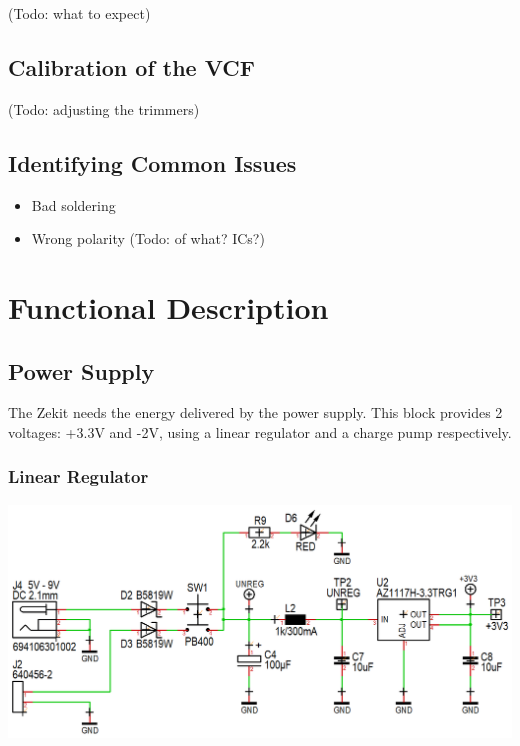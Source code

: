 \documentclass{scrartcl}
\begin{document}
 (Todo: what to expect)

\subsection{Calibration of the VCF}

(Todo: adjusting the trimmers)

\subsection{Identifying Common Issues}

\begin{itemize}
    \item Bad soldering
    \item Wrong polarity (Todo: of what? ICs?)
\end{itemize}

\pagebreak


\section{Functional Description}

\subsection{Power Supply}

The Zekit needs the energy delivered by the power supply. This block provides 2 voltages: +3.3V and -2V, using a linear regulator and a charge pump respectively.

\subsubsection{Linear Regulator}

\begin{center}
    \includegraphics[scale=0.4]{assets/schema-power.png}
\end{center}
\end{document}
